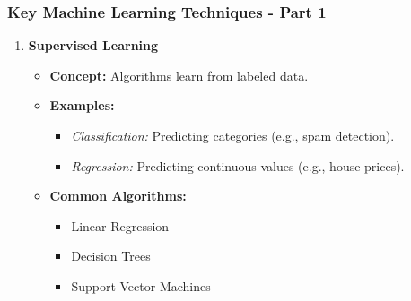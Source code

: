 \documentclass[aspectratio=169]{beamer}
\begin{document}
\begin{frame}[fragile]
    \frametitle{Key Machine Learning Techniques - Part 1}
    \begin{enumerate}
        \item \textbf{Supervised Learning}
        \begin{itemize}
            \item \textbf{Concept:} Algorithms learn from labeled data.
            \item \textbf{Examples:}
            \begin{itemize}
                \item \textit{Classification:} Predicting categories (e.g., spam detection).
                \item \textit{Regression:} Predicting continuous values (e.g., house prices).
            \end{itemize}
            \item \textbf{Common Algorithms:}
            \begin{itemize}
                \item Linear Regression
                \item Decision Trees
                \item Support Vector Machines
            \end{itemize}
        \end{itemize}
    \end{enumerate}
\end{frame}
\end{document}
